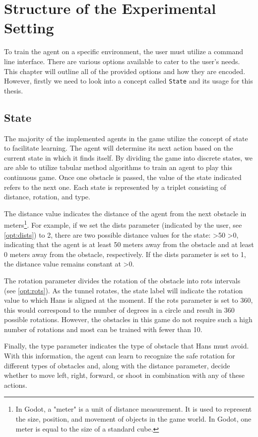 \chapter{Structure of the Experimental Setting}
\label{agent_code_chapter}
To train the agent on a specific environment, the user must utilize a command line interface. There are various options available to cater to the user's needs. This chapter will outline all of the provided options and how they are encoded. However, firstly we need to look into a concept called \texttt{State} and its usage for this thesis.

\section{State}
The majority of the implemented agents in the game utilize the concept of state to facilitate learning. The agent will determine its next action based on the current state in which it finds itself. By dividing the game into discrete states, we are able to utilize tabular method algorithms to train an agent to play this continuous game. Once one obstacle is passed, the value of the state indicated refers to the next one. Each state is represented by a triplet consisting of distance, rotation, and type. 

The distance value indicates the distance of the agent from the next obstacle in meters\footnote{In Godot, a "meter" is a unit of distance measurement. It is used to represent the size, position, and movement of objects in the game world. In Godot, one meter is equal to the size of a standard cube.}. For example, if we set the dists parameter (indicated by the user, see \ref{opt:dists}) to 2, there are two possible distance values for the state: >50 >0, indicating that the agent is at least 50 meters away from the obstacle and at least 0 meters away from the obstacle, respectively. If the dists parameter is set to 1, the distance value remains constant at >0. 

The rotation parameter divides the rotation of the obstacle into rots intervals (see \ref{opt:rots}). As the tunnel rotates, the state label will indicate the rotation value to which Hans is aligned at the moment. If the rots parameter is set to 360, this would correspond to the number of degrees in a circle and result in 360 possible rotations. However, the obstacles in this game do not require such a high number of rotations and most can be trained with fewer than 10. 

Finally, the type parameter indicates the type of obstacle that Hans must avoid. With this information, the agent can learn to recognize the safe rotation for different types of obstacles and, along with the distance parameter, decide whether to move left, right, forward, or shoot in combination with any of these actions.

